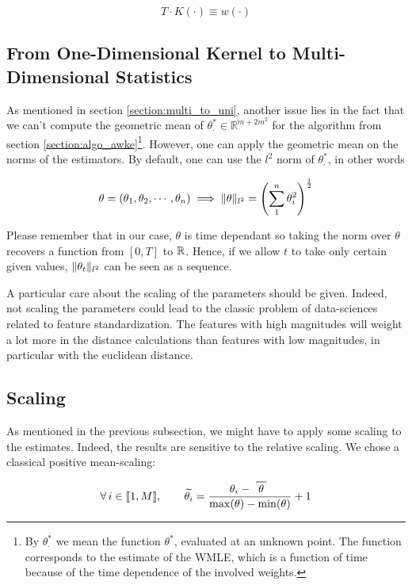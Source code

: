 $$ T \cdot K ( \cdot ) \equiv w ( \cdot ) $$

\subsection{From One-Dimensional Kernel to Multi-Dimensional Statistics}
As mentioned in section \ref{section:multi_to_uni}, another issue lies in the fact that we can't compute the geometric mean of $\theta^*_{\cdot} \in \mathbb R^{m+2m^2}$ for the algorithm from section \ref{section:algo_awke}\footnote{By $\theta^*_{\cdot}$ we mean the function $\theta^*$, evaluated at an unknown point. The function corresponds to the estimate of the WMLE, which is a function of time because of the time dependence of the involved weights.}.
However, one can apply the geometric mean on the norms of the estimators. By default, one can use the $l^2$ norm of $\theta^*_{\cdot}$, in other words

$$\theta = (\theta_1, \theta_2, \cdots, \theta_n ) \implies 
\lVert \theta\rVert_{l^2} = \left ( \sum^n_1 \theta_i^2 \right )^{\frac 1 2}$$ 

Please remember that in our case, $\theta$ is time dependant so taking the norm over $\theta$ recovers a function from $[0,T]$ to $\mathbb{R}$. Hence, if we allow $t$ to take only certain given values, $\lVert \theta_t\rVert_{l^2}$ can be seen as a sequence.


\begin{remarque}
A particular care about the scaling of the parameters should be given. Indeed, not scaling the parameters could lead to the classic problem of data-sciences related to feature standardization. The features with high magnitudes will weight a lot more in the distance calculations than features with low magnitudes, in particular with the euclidean distance.
\end{remarque}

\subsection{Scaling}
\label{subsection:scaling}

As mentioned in the previous subsection, we might have to apply some scaling to the estimates. Indeed, the results are sensitive to the relative scaling. We chose a classical positive mean-scaling:

\begin{equation}
\forall i \in  \llbracket 1, M \rrbracket, \qquad  \widetilde{\theta_i } = \frac{\theta_i - \mean \theta }{\max(\theta) - \min(\theta) } + 1 
\label{rescale-function}
\end{equation}

